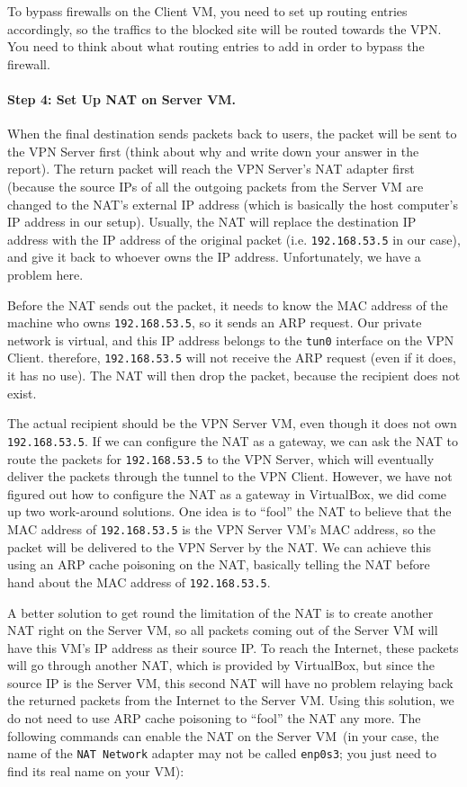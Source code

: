 To bypass firewalls on the Client VM, you need to set up 
routing entries accordingly, so the traffics to the blocked site
will be routed towards the VPN. You need to think about what 
routing entries to add in order to bypass the firewall. 



\paragraph{Step 4: Set Up NAT on Server VM.}
When the final destination sends packets back to users, the packet
will be sent to the VPN Server first (think about why and write down your answer 
in the report). The return packet will reach the VPN Server's NAT
adapter first (because the source IPs of all  the outgoing
packets from the Server VM are changed to the NAT's external IP address (which is basically the host computer's IP
address in our setup). Usually, the NAT will replace the destination IP address with the IP
address of the original packet (i.e. \texttt{192.168.53.5} in our case), and give it back to whoever owns
the IP address.  Unfortunately, we have a problem here.


Before the NAT sends out the packet, it needs to know the MAC address of the machine who owns
\texttt{192.168.53.5}, so it sends an ARP request. Our private network is virtual, and 
this IP address belongs to the \texttt{tun0} interface on the VPN Client.  
therefore, \texttt{192.168.53.5} will not receive the ARP request (even if it does, it has no
use). The NAT will then drop the packet, because the recipient does not exist.


The actual recipient should be the VPN Server VM, even though it does not own 
\texttt{192.168.53.5}.  If
we can configure the NAT as a gateway, we can ask the NAT to route the packets for
\texttt{192.168.53.5} to 
the VPN Server, which will eventually deliver the packets through the tunnel to the VPN Client. However,
we have not figured out how to configure the NAT as a gateway in VirtualBox, we did
come up two work-around solutions. One idea is to ``fool'' the NAT to believe that the MAC address of
\texttt{192.168.53.5} is the VPN Server VM's MAC address, so the packet will be delivered to
the VPN Server by the NAT. We can achieve this using an ARP cache poisoning on the NAT, basically telling the
NAT before hand about the MAC address of \texttt{192.168.53.5}.

A better solution to get round the limitation of the NAT is to create another NAT
right on the Server VM, so all packets coming out of the Server VM will have this VM's IP address as their source IP.
To reach the Internet, these packets will go through another NAT, which is provided by
VirtualBox, but since the source IP is the Server VM, this second NAT will have no problem relaying back
the returned packets from the Internet to the Server VM. Using this solution, we do not need to use ARP
cache poisoning to ``fool'' the NAT any more. The following commands can enable the NAT on
the Server VM~(in your case, the name of the \texttt{NAT Network} adapter may not be called 
\texttt{enp0s3}; you just need to find its real name on your VM):

